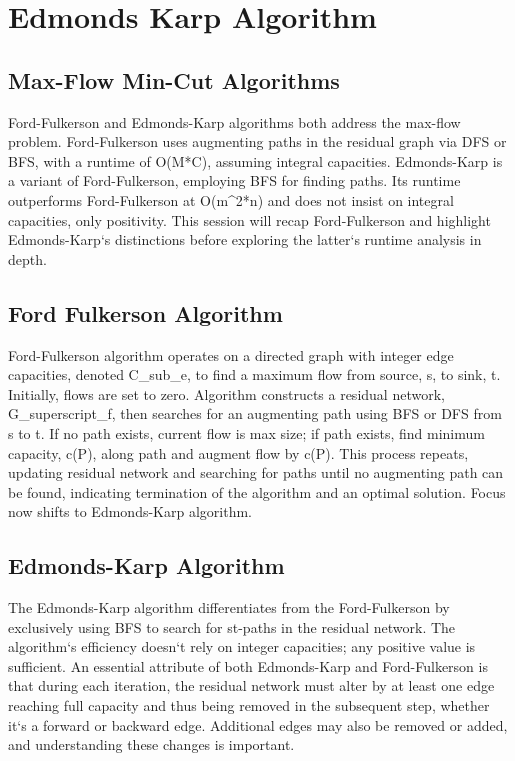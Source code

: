 \section*{Edmonds Karp Algorithm}

\subsection*{Max-Flow Min-Cut Algorithms}
Ford-Fulkerson and Edmonds-Karp algorithms both address the max-flow problem.
Ford-Fulkerson uses augmenting paths in the residual graph via DFS or BFS, with a runtime of O(M*C), assuming integral capacities.
Edmonds-Karp is a variant of Ford-Fulkerson, employing BFS for finding paths.
Its runtime outperforms Ford-Fulkerson at O(m\textasciicircum{}2*n) and does not insist on integral capacities, only positivity.
This session will recap Ford-Fulkerson and highlight Edmonds-Karp`s distinctions before exploring the latter`s runtime analysis in depth.

\subsection*{Ford Fulkerson Algorithm}
Ford-Fulkerson algorithm operates on a directed graph with integer edge capacities, denoted C\_sub\_e, to find a maximum flow from source, s, to sink, t.
Initially, flows are set to zero.
Algorithm constructs a residual network, G\_superscript\_f, then searches for an augmenting path using BFS or DFS from s to t.
If no path exists, current flow is max size; if path exists, find minimum capacity, c(P), along path and augment flow by c(P).
This process repeats, updating residual network and searching for paths until no augmenting path can be found, indicating termination of the algorithm and an optimal solution.
Focus now shifts to Edmonds-Karp algorithm.

\subsection*{Edmonds-Karp Algorithm}
The Edmonds-Karp algorithm differentiates from the Ford-Fulkerson by exclusively using BFS to search for st-paths in the residual network.
The algorithm`s efficiency doesn`t rely on integer capacities; any positive value is sufficient.
An essential attribute of both Edmonds-Karp and Ford-Fulkerson is that during each iteration, the residual network must alter by at least one edge reaching full capacity and thus being removed in the subsequent step, whether it`s a forward or backward edge.
Additional edges may also be removed or added, and understanding these changes is important.

